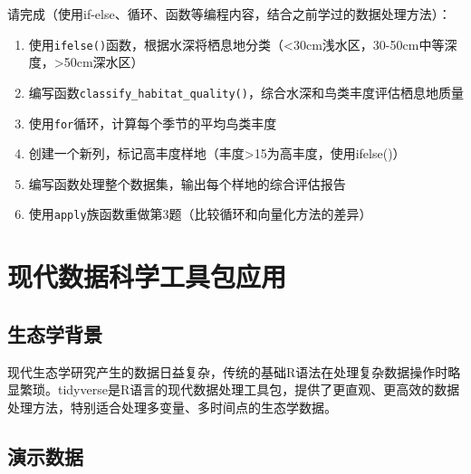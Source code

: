 \documentclass[
]{book}
\begin{document}
请完成（使用if-else、循环、函数等编程内容，结合之前学过的数据处理方法）：

\begin{enumerate}
\def\labelenumi{\arabic{enumi}.}
\item
  使用\texttt{ifelse()}函数，根据水深将栖息地分类（\textless30cm浅水区，30-50cm中等深度，\textgreater50cm深水区）
\item
  编写函数\texttt{classify\_habitat\_quality()}，综合水深和鸟类丰度评估栖息地质量
\item
  使用\texttt{for}循环，计算每个季节的平均鸟类丰度
\item
  创建一个新列，标记高丰度样地（丰度\textgreater15为高丰度，使用ifelse()）
\item
  编写函数处理整个数据集，输出每个样地的综合评估报告
\item
  使用\texttt{apply}族函数重做第3题（比较循环和向量化方法的差异）
\end{enumerate}

\hypertarget{ux73b0ux4ee3ux6570ux636eux79d1ux5b66ux5de5ux5177ux5305ux5e94ux7528}{%
\section{现代数据科学工具包应用}\label{ux73b0ux4ee3ux6570ux636eux79d1ux5b66ux5de5ux5177ux5305ux5e94ux7528}}

\hypertarget{ux751fux6001ux5b66ux80ccux666f-8}{%
\subsection{生态学背景}\label{ux751fux6001ux5b66ux80ccux666f-8}}

现代生态学研究产生的数据日益复杂，传统的基础R语法在处理复杂数据操作时略显繁琐。tidyverse是R语言的现代数据处理工具包，提供了更直观、更高效的数据处理方法，特别适合处理多变量、多时间点的生态学数据。

\hypertarget{ux6f14ux793aux6570ux636e-7}{%
\subsection{演示数据}\label{ux6f14ux793aux6570ux636e-7}}
\end{document}
